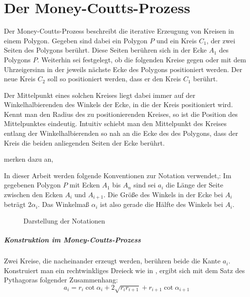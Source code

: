 \chapter{Der Money-Coutts-Prozess}

Der Money-Coutts-Prozess beschreibt die iterative Erzeugung von Kreisen in einem Polygon.
Gegeben sind dabei ein Polygon $P$ und ein Kreis $C_1$, der zwei Seiten des Polygons berührt.
Diese Seiten berühren sich in der Ecke $A_1$ des Polygons $P$.
Weiterhin sei festgelegt, ob die folgenden Kreise gegen oder mit dem Uhrzeigersinn in der jeweils nächste Ecke des Polygons positioniert werden.
Der neue Kreis $C_2$ soll so positioniert werden, dass er den Kreis $C_1$ berührt.

Der Mittelpunkt eines solchen Kreises liegt dabei immer auf der Winkelhalbierenden des Winkels der Ecke, in die der Kreis positioniert wird.
Kennt man den Radius des zu positionierenden Kreises, so ist die Position des Mittelpunktes eindeutig.
Intuitiv schiebt man den Mittelpunkt des Kreises entlang der Winkelhalbierenden so nah an die Ecke des des Polygons,
dass der Kreis die beiden anliegenden Seiten der Ecke berührt.

\citet{Taba2013} merken dazu an,

In dieser Arbeit werden folgende Konventionen zur Notation verwendet,:
Im gegebenen Polygon $P$ mit Ecken $A_1$ bis $A_n$ sind sei $a_i$ die Länge der Seite zwischen den Ecken $A_i$ und $A_{i+1}$.
Die Größe des Winkels in der Ecke bei $A_i$ beträgt $2\alpha_i$.
Das Winkelmaß $\alpha_i$ ist also gerade die Hälfte des Winkels bei $A_i$.

\begin{figure}[htbp]
    
    \caption{Darstellung der Notationen}
\end{figure}

\paragraph{Konstruktion im Money-Coutts-Prozess}

Zwei Kreise, die nacheinander erzeugt werden, berühren beide die Kante $a_i$.
Konstruiert man ein rechtwinkliges Dreieck wie in ,
ergibt sich mit dem Satz des Pythagoras folgender Zusammenhang:
\begin{equation}
    a_i = r_i\cot\alpha_i + 2\sqrt{r_i r_{i+1}} +r_{i+1}\cot\alpha_{i+1}
    \label{mcp:two-circles}
\end{equation}

